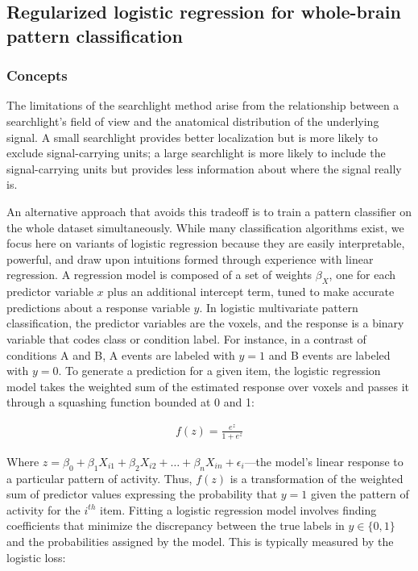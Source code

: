 \subsection{Regularized logistic regression for whole-brain pattern classification}
\subsubsection{Concepts}
The limitations of the searchlight method arise from the relationship between a searchlight's field of view and the anatomical distribution of the underlying signal. A small searchlight provides better localization but is more likely to exclude signal-carrying units; a large searchlight is more likely to include the signal-carrying units but provides less information about where the signal really is. 

An alternative approach that avoids this tradeoff is to train a pattern classifier on the whole dataset simultaneously. While many classification algorithms exist, we focus here on variants of logistic regression because they are easily interpretable, powerful, and draw upon intuitions formed through experience with linear regression. A regression model is composed of a set of weights $\beta_X$, one for each predictor variable $x$ plus an additional intercept term, tuned to make accurate predictions about a response variable $y$. In logistic multivariate pattern classification, the predictor variables are the voxels, and the response is a binary variable that codes class or condition label. For instance, in a contrast of conditions A and B, A events are labeled with $y=1$ and B events are labeled with $y=0$. To generate a prediction for a given item, the logistic regression model takes the weighted sum of the estimated response over voxels and passes it through a squashing function bounded at 0 and 1:

\begin{align}
f(z) = \frac{e^z}{1+e^{z}}
\label{eq.logisticloss}
\end{align}

Where $z = \beta_0 + \beta_1X_{i 1} + \beta_2X_{i 2} + \dots +  \beta_nX_{i n} + \epsilon_{i}$---the model's linear response to a particular pattern of activity. Thus, $f(z)$ is a transformation of the weighted sum of predictor values expressing the probability that $y=1$ given the pattern of activity for the $i^{th}$ item. Fitting a logistic regression model involves finding coefficients that minimize the discrepancy between the true labels in $y \in{\{0,1\}}$ and the probabilities assigned by the model. This is typically measured by the logistic loss:

